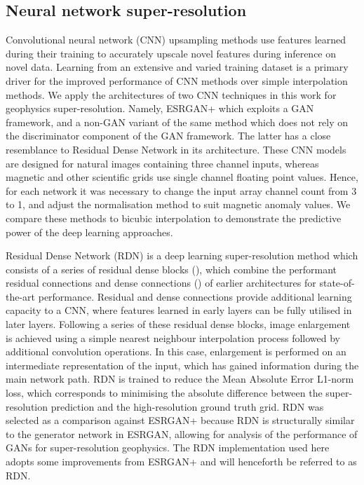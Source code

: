 \subsection{Neural network super-resolution}
\label{sec:nnsr}
Convolutional neural network (CNN) upsampling methods use features learned during their training to accurately upscale novel features during inference on novel data.
Learning from an extensive and varied training dataset is a primary driver for the improved performance of CNN methods over simple interpolation methods.
We apply the architectures of two CNN techniques in this work for geophysics super-resolution.
Namely, ESRGAN+ \parencite{rakotonirinaESRGANFurtherImproving2020} which exploits a GAN framework, and a non-GAN variant of the same method which does not rely on the discriminator component of the GAN framework.
The latter has a close resemblance to Residual Dense Network \parencite{zhangResidualDenseNetwork2018} in its architecture.
These CNN models are designed for natural images containing three channel inputs, whereas magnetic and other scientific grids use single channel floating point values.
Hence, for each network it was necessary to change the input array channel count from 3 to 1, and adjust the normalisation method to suit magnetic anomaly values.
We compare these methods to bicubic interpolation to demonstrate the predictive power of the deep learning approaches.

Residual Dense Network (RDN) \parencite{zhangResidualDenseNetwork2018} is a deep learning super-resolution method which consists of a series of residual dense blocks (), which combine the performant residual connections and dense connections () of earlier architectures for state-of-the-art performance.
Residual and dense connections provide additional learning capacity to a CNN, where features learned in early layers can be fully utilised in later layers.
Following a series of these residual dense blocks, image enlargement is achieved using a simple nearest neighbour interpolation process followed by additional convolution operations.
In this case, enlargement is performed on an intermediate representation of the input, which has gained information during the main network path.
RDN is trained to reduce the Mean Absolute Error L1-norm loss, which corresponds to minimising the absolute difference between the super-resolution prediction and the high-resolution ground truth grid.
RDN was selected as a comparison against ESRGAN+ because RDN is structurally similar to the generator network in ESRGAN, allowing for analysis of the performance of GANs for super-resolution geophysics.
The RDN implementation used here adopts some improvements from ESRGAN+ and will henceforth be referred to as RDN\textdaggerdbl{}.

